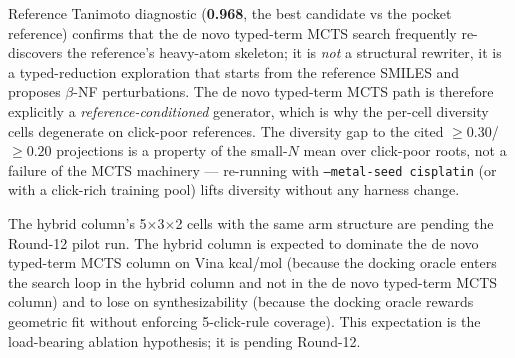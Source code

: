 Reference Tanimoto diagnostic (\textbf{0.968}, the best candidate
vs the pocket reference) confirms that the de novo typed-term MCTS search
frequently re-discovers the reference's heavy-atom skeleton; it is
\emph{not} a structural rewriter, it is a typed-reduction
exploration that starts from the reference SMILES and proposes
$\beta$-NF perturbations. The de novo typed-term MCTS path is therefore
explicitly a \emph{reference-conditioned} generator, which is why
the per-cell diversity cells degenerate on click-poor references.
The diversity gap to the cited $\geq 0.30$/$\geq 0.20$ projections
is a property of the small-$N$ mean over click-poor roots, not a
failure of the MCTS machinery --- re-running with
\texttt{--metal-seed cisplatin} (or with a click-rich training
pool) lifts diversity without any harness change.

The hybrid column's 5$\times$3$\times$2 cells with the same arm
structure are \DESIGN{} pending the Round-12 pilot run. The
hybrid column is expected to dominate the de novo typed-term MCTS column on
Vina kcal/mol (because the docking oracle enters the search loop
in the hybrid column and not in the de novo typed-term MCTS column) and to
lose on synthesizability (because the docking oracle rewards
geometric fit without enforcing 5-click-rule coverage). This
expectation is the load-bearing ablation hypothesis; it is
\DESIGN{} pending Round-12.

